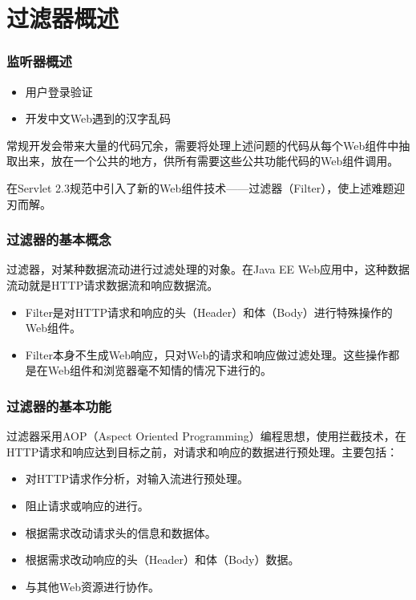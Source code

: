 \section{过滤器概述}

\begin{frame}
\frametitle{监听器概述} 


\begin{itemize}
\item 用户登录验证
\item 开发中文Web遇到的汉字乱码
\end{itemize}

常规开发会带来大量的代码冗余，需要将处理上述问题的代码从每个Web组件中抽取出来，放在一个公共的地方，供所有需要这些公共功能代码的Web组件调用。

在Servlet 2.3规范中引入了新的Web组件技术——{\hei 过滤器（Filter）}，使上述难题迎刃而解。
\end{frame}

\begin{frame}[fragile] %
\frametitle{过滤器的基本概念}

{\hei 过滤器，对某种数据流动进行过滤处理的对象。在Java EE Web应用中，这种数据流动就是HTTP请求数据流和响应数据流。}

\begin{itemize}
\item Filter是对HTTP请求和响应的头（Header）和体（Body）进行特殊操作的Web组件。
\item Filter本身不生成Web响应，只对Web的请求和响应做过滤处理。这些操作都是在Web组件和浏览器毫不知情的情况下进行的。
\end{itemize}
\end{frame}

\begin{frame}[fragile] %
\frametitle{过滤器的基本功能} 
过滤器采用AOP（Aspect Oriented Programming）编程思想，使用拦截技术，在HTTP请求和响应达到目标之前，对请求和响应的数据进行预处理。主要包括：
\begin{itemize}
\item 对HTTP请求作分析，对输入流进行预处理。
\item 阻止请求或响应的进行。
\item 根据需求改动请求头的信息和数据体。
\item 根据需求改动响应的头（Header）和体（Body）数据。
\item 与其他Web资源进行协作。
\end{itemize}
\end{frame}

